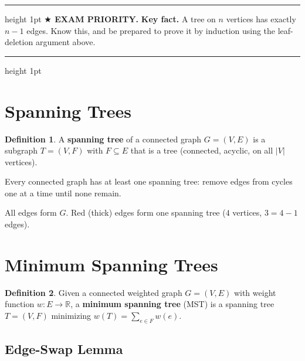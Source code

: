 \documentclass[11pt]{article}
\theoremstyle{definition}
\newtheorem*{definition*}{Definition}
\newenvironment{exambox}
  {\par\medskip\noindent\begin{center}\begin{minipage}{0.92\textwidth}%
   \hrule height 1pt \vspace{4pt}\noindent\textbf{$\bigstar$ EXAM PRIORITY.} }
  {\vspace{4pt}\hrule height 1pt \end{minipage}\end{center}\medskip}
\begin{document}
\begin{exambox}
\textbf{Key fact.} A tree on $n$ vertices has exactly $n - 1$ edges.
Know this, and be prepared to prove it by induction using the leaf-deletion argument
above.
\end{exambox}

\section*{Spanning Trees}

\begin{definition*}
A \textbf{spanning tree} of a connected graph $G = (V, E)$ is a subgraph
$T = (V, F)$ with $F \subseteq E$ that is a tree (connected, acyclic, on all
$|V|$ vertices).
\end{definition*}

Every connected graph has at least one spanning tree: remove edges from cycles one at
a time until none remain.

\begin{center}

\smallskip
{\small All edges form $G$. Red (thick) edges form one spanning tree
($4$ vertices, $3 = 4{-}1$ edges).}
\end{center}

\section*{Minimum Spanning Trees}

\begin{definition*}
Given a connected weighted graph $G = (V, E)$ with weight function
$w : E \to \mathbb{R}$, a \textbf{minimum spanning tree} (MST) is a spanning tree
$T = (V, F)$ minimizing $w(T) = \sum_{e \in F} w(e)$.
\end{definition*}

\subsection*{Edge-Swap Lemma}
\end{document}
